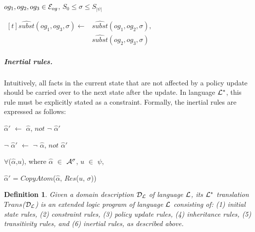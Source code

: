 \documentclass[11pt, twocolumn]{article}
\newtheorem{vdefinition}{Definition}
\newenvironment{vquote}
  {\begin{list}{}{\leftmargin 1em}\item[]}
  {\end{list}}
\begin{document}
\begin{enumerate}
                $og_{1}, og_{2}, og_{3} \in {\cal E}_{og}$,
                $S_{0} \leq \sigma \leq S_{|\psi|}$

                \begin{math}
                  \begin{aligned}[t]
                    \hat{subst}(og_{1}, og_{3}, \sigma) \leftarrow &
                    \hat{subst}(og_{1}, og_{2}, \sigma), \\
                    & \hat{subst}(og_{2}, og_{3}, \sigma)
                  \end{aligned}
                \end{math}
            \end{enumerate}

          \subparagraph{Inertial rules.}

            Intuitively, all facts in the current state that are not affected
            by a policy update should be carried over to the next state after
            the update. In language ${\cal L}^{*}$, this rule must be
            explicitly stated as a constraint. Formally, the inertial rules
            are expressed as follows:

            \begin{vquote}
              $\hat{\alpha}'$ $\leftarrow$ $\hat{\alpha}$, $not$ $\lnot$ $\hat{\alpha}'$

              $\lnot$ $\hat{\alpha}'$ $\leftarrow$ $\lnot$ $\hat{\alpha}$, $not$ $\hat{\alpha}'$

              $\forall$($\hat{\alpha}$,$u$), where
              $\hat{\alpha}$ $\in$ ${\cal A}^{\sigma}$,
              $u$ $\in$ $\psi$,

              $\hat{\alpha}'$ = $CopyAtom$($\hat{\alpha}$, $Res$($u$, $\sigma$))
            \end{vquote}

        \begin{vdefinition}
          Given a domain description ${\cal D_{L}}$ of language ${\cal L}$, its
          ${\cal L^{*}}$ translation $Trans$(${\cal D_{L}}$) is an extended
          logic program of language ${\cal L}$ consisting of: (1) initial state
          rules, (2) constraint rules, (3) policy update rules, (4) inheritance
          rules, (5) transitivity rules, and (6) inertial rules, as described
          above.
        \end{vdefinition}
\end{document}
